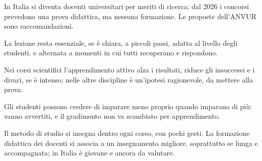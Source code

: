 \begin{sintesi}
  \item In Italia si diventa docenti universitari per meriti di
        ricerca; dal 2026 i concorsi prevedono una prova didattica, ma
        nessuna formazione. Le proposte dell'ANVUR sono
        raccomandazioni.
  \item La lezione resta essenziale, se è chiara, a piccoli passi,
        adatta al livello degli studenti, e alternata a momenti in cui
        tutti recuperano e rispondono.
  \item Nei corsi scientifici l'apprendimento attivo alza i risultati,
        riduce gli insuccessi e i divari, se è intenso; nelle altre
        discipline è un'ipotesi ragionevole, da mettere alla prova.
  \item Gli studenti possono credere di imparare meno proprio quando
        imparano di più: vanno avvertiti, e il gradimento non va
        scambiato per apprendimento.
  \item Il metodo di studio si insegna dentro ogni corso, con pochi
        gesti. La formazione didattica dei docenti si associa a un
        insegnamento migliore, soprattutto se lunga e accompagnata; in
        Italia è giovane e ancora da valutare.
\end{sintesi}

\finecapitolo
